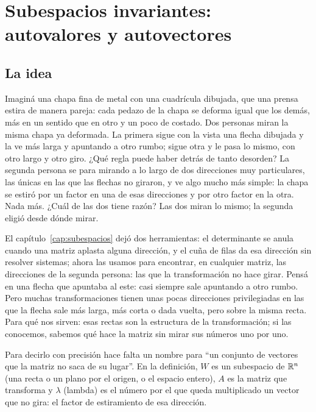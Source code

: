 \chapter{Subespacios invariantes: autovalores y autovectores}\label{cap:autovectores}

\section{La idea}

Imaginá una chapa fina de metal con una cuadrícula dibujada, que una prensa estira de manera
pareja: cada pedazo de la chapa se deforma igual que los demás, más en un sentido que en otro y
un poco de costado. Dos personas miran la misma chapa ya deformada. La primera sigue con la
vista una flecha dibujada y la ve más larga y apuntando a otro rumbo; sigue otra y le pasa lo
mismo, con otro largo y otro giro. ¿Qué regla puede haber detrás de tanto desorden?
La segunda persona se para mirando a lo largo de dos direcciones muy particulares, las únicas
en las que las flechas no giraron, y ve algo mucho más simple: la chapa se estiró por un factor
en una de esas direcciones y por otro factor en la otra. Nada más. ¿Cuál de las dos tiene
razón? Las dos miran lo mismo; la segunda eligió desde dónde mirar.

El capítulo~\ref{cap:subespacios} dejó dos herramientas: el determinante se anula cuando una
matriz aplasta alguna dirección, y el cuña de filas da esa dirección sin resolver sistemas;
ahora las usamos para encontrar, en cualquier matriz, las direcciones de la segunda persona: las
que la transformación no hace girar.
Pensá en una flecha que apuntaba al este: casi siempre sale apuntando a otro rumbo. Pero muchas
transformaciones tienen unas pocas direcciones privilegiadas en las que la flecha sale más
larga, más corta o dada vuelta, pero sobre la misma recta. Para qué nos sirven: esas rectas son
la estructura de la transformación; si las conocemos, sabemos qué hace la matriz sin mirar sus
números uno por uno.

Para decirlo con precisión hace falta un nombre para \enquote{un conjunto de vectores que la
matriz no saca de su lugar}. En la definición, \(W\) es un subespacio de \(\mathbb{R}^n\) (una recta o
un plano por el origen, o el espacio entero), \(A\) es la matriz que transforma y \(\lambda\)
(lambda) es el número por el que queda multiplicado un vector que no gira: el factor de
estiramiento de esa dirección.

